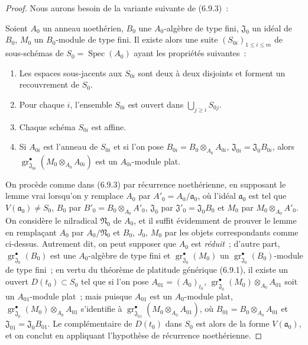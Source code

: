 \begin{proof}
Nous aurons besoin de la variante suivante de (6.9.3)~:

\begin{lemma}[11.2.9.5]
\label{IV.11.2.9.5-fr}
Soient $A_0$ un anneau noethérien, $B_0$ une $A_0$-algèbre de type fini,
$\mathfrak J_0$ un idéal de $B_0$, $M_0$ un $B_0$-module de type fini. Il
existe alors une suite $(S_{0i})_{1\leq i\leq m}$ de sous-schémas de
$S_0=\operatorname{Spec}(A_0)$ ayant les propriétés suivantes~:
\begin{enumerate}[label=\textup{\arabic{enumi}}$^\circ$]
\item Les espaces sous-jacents aux $S_{0i}$ sont deux à deux disjoints et
forment un recouvrement de $S_0$.
\item Pour chaque $i$, l'ensemble $S_{0i}$ est ouvert dans
$\bigcup_{j\geq i}S_{0j}$.
\item Chaque schéma $S_{0i}$ est affine.
\item Si $A_{0i}$ est l'anneau de $S_{0i}$ et si l'on pose
$B_{0i}=B_0\otimes_{A_0}A_{0i}$, $\mathfrak J_{0i}=\mathfrak J_0B_{0i}$,
alors
$\operatorname{gr}_{\mathfrak J_{0i}}^\bullet(M_0\otimes_{A_0}A_{0i})$ est un
$A_{0i}$-module plat.
\end{enumerate}
\end{lemma}

On procède comme dans (6.9.3) par récurrence noethérienne, en supposant le
lemme vrai lorsqu'on y remplace $A_0$ par $A'_0=A_0/\mathfrak a_0$, où
l'idéal $\mathfrak a_0$ est tel que $V(\mathfrak a_0)\neq S_0$, $B_0$ par
$B'_0=B_0\otimes_{A_0}A'_0$, $\mathfrak J_0$ par
$\mathfrak J'_0=\mathfrak J_0B_0$ et $M_0$ par $M_0\otimes_{A_0}A'_0$. On
considère le nilradical $\mathfrak N_0$ de $A_0$, et il suffit évidemment de
prouver le lemme en remplaçant $A_0$ par $A_0/\mathfrak N_0$ et $B_0$,
$J_0$, $M_0$ par les objets correspondants comme ci-dessus.
Autrement dit, on peut supposer que $A_0$ est \emph{réduit}~; d'autre part,
$\operatorname{gr}_{\mathfrak J_0}^\bullet(B_0)$ est une $A_0$-algèbre de type fini
et $\operatorname{gr}_{\mathfrak J_0}^\bullet(M_0)$ un
$\operatorname{gr}_{\mathfrak J_0}^\bullet(B_0)$-module de type fini~; en vertu du
théorème de platitude générique (6.9.1), il existe un ouvert
$D(t_0)\subset S_0$ tel que si l'on pose $A_{01}=(A_0)_{t_0}$,
$\operatorname{gr}_{\mathfrak J_0}^\bullet(M_0)\otimes_{A_0}A_{01}$ soit un
$A_{01}$-module plat~; mais puisque $A_{01}$ est un $A_0$-module plat,
$\operatorname{gr}_{\mathfrak J_0}^\bullet(M_0)\otimes_{A_0}A_{01}$ s'identifie à
$\operatorname{gr}_{\mathfrak J_{01}}^\bullet(M_0\otimes_{A_0}A_{01})$, où
$B_{01}=B_0\otimes_{A_0}A_{01}$ et $\mathfrak J_{01}=\mathfrak J_0B_{01}$.
Le complémentaire de $D(t_0)$ dans $S_0$ est alors de la forme
$V(\mathfrak a_0)$, et on conclut en appliquant l'hypothèse de récurrence
noethérienne.


\end{proof}
